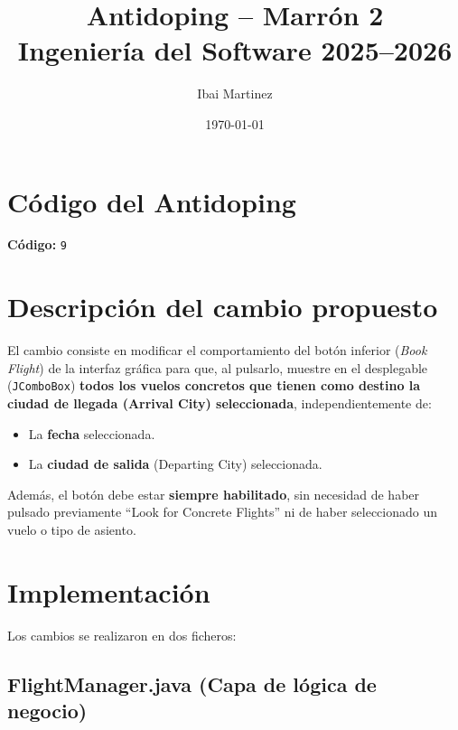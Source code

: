 \documentclass[12pt,a4paper]{article}
\title{\textbf{Antidoping -- Marrón 2} \\ \large Ingeniería del Software 2025--2026}
\author{Ibai Martinez}
\date{\today}
\begin{document}
\maketitle

\section{Código del Antidoping}

\textbf{Código:} \texttt{9}

\section{Descripción del cambio propuesto}

El cambio consiste en modificar el comportamiento del botón inferior (\textit{Book Flight}) de la interfaz gráfica para que, al pulsarlo, muestre en el desplegable (\texttt{JComboBox}) \textbf{todos los vuelos concretos que tienen como destino la ciudad de llegada (Arrival City) seleccionada}, independientemente de:

\begin{itemize}
    \item La \textbf{fecha} seleccionada.
    \item La \textbf{ciudad de salida} (Departing City) seleccionada.
\end{itemize}

Además, el botón debe estar \textbf{siempre habilitado}, sin necesidad de haber pulsado previamente ``Look for Concrete Flights'' ni de haber seleccionado un vuelo o tipo de asiento.

\section{Implementación}

Los cambios se realizaron en dos ficheros:

\subsection{FlightManager.java (Capa de lógica de negocio)}
\end{document}

